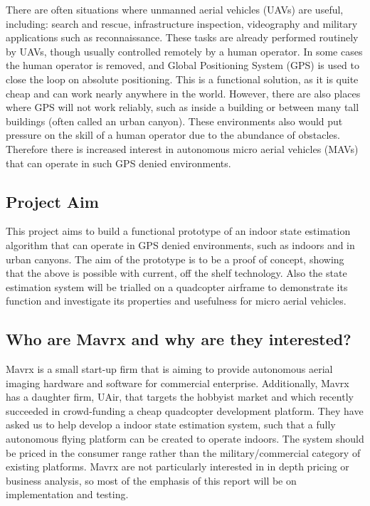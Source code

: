 \documentclass[]{article}
\begin{document}
{There are often situations where unmanned aerial vehicles (UAVs) are useful, including: search and rescue, infrastructure inspection, videography and military applications such as reconnaissance. These tasks are already performed routinely by UAVs, though usually controlled remotely by a human operator. In some cases the human operator is removed, and Global Positioning System (GPS) is used to close the loop on absolute positioning. This is a functional solution, as it is quite cheap and can work nearly anywhere in the world. However, there are also places where GPS will not work reliably, such as inside a building or between many tall buildings (often called an urban canyon). These environments also would put pressure on the skill of a human operator due to the abundance of obstacles.
Therefore there is increased interest in autonomous micro aerial vehicles (MAVs) that can operate in such GPS denied environments.


\subsection{Project Aim}
\label{sub:what_are_we_trying_to_achieve}
This project aims to build a functional prototype of an indoor state estimation algorithm that can operate in GPS denied environments, such as indoors and in urban canyons. The aim of the prototype is to be a proof of concept, showing that the above is possible with current, off the shelf technology. Also the state estimation system will be trialled on a quadcopter airframe to demonstrate its function and investigate its properties and usefulness for micro aerial vehicles. 

\subsection{Who are Mavrx and why are they interested?} %
\label{sub:why_are_mavrx_interested_in_this_work_}

Mavrx is a small start-up firm that is aiming to provide autonomous aerial imaging hardware and software for commercial enterprise. Additionally, Mavrx has a daughter firm, UAir, that targets the hobbyist market and which recently succeeded in crowd-funding a cheap quadcopter development platform. They have asked us to help develop a indoor state estimation system, such that a fully autonomous flying platform can be created to operate indoors. The system should be priced in the consumer range rather than the military/commercial category of existing platforms. Mavrx are not particularly interested in in depth pricing or business analysis, so most of the emphasis of this report will be on implementation and testing. 


}
\end{document}
